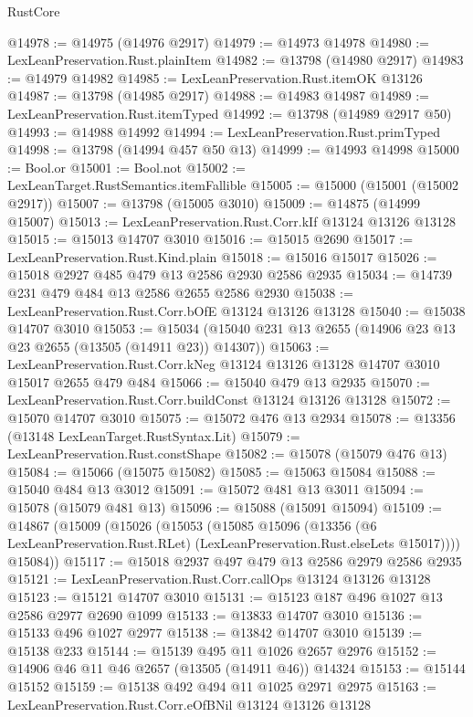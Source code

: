 \begin{lexlean}{RustCore}
\begin{coremodule}
@14978 := @14975 (@14976 @2917)
@14979 := @14973 @14978
@14980 := LexLeanPreservation.Rust.plainItem
@14982 := @13798 (@14980 @2917)
@14983 := @14979 @14982
@14985 := LexLeanPreservation.Rust.itemOK @13126
@14987 := @13798 (@14985 @2917)
@14988 := @14983 @14987
@14989 := LexLeanPreservation.Rust.itemTyped
@14992 := @13798 (@14989 @2917 @50)
@14993 := @14988 @14992
@14994 := LexLeanPreservation.Rust.primTyped
@14998 := @13798 (@14994 @457 @50 @13)
@14999 := @14993 @14998
@15000 := Bool.or
@15001 := Bool.not
@15002 := LexLeanTarget.RustSemantics.itemFallible
@15005 := @15000 (@15001 (@15002 @2917))
@15007 := @13798 (@15005 @3010)
@15009 := @14875 (@14999 @15007)
@15013 := LexLeanPreservation.Rust.Corr.kIf @13124 @13126 @13128
@15015 := @15013 @14707 @3010
@15016 := @15015 @2690
@15017 := LexLeanPreservation.Rust.Kind.plain
@15018 := @15016 @15017
@15026 := @15018 @2927 @485 @479 @13 @2586 @2930 @2586 @2935
@15034 := @14739 @231 @479 @484 @13 @2586 @2655 @2586 @2930
@15038 := LexLeanPreservation.Rust.Corr.bOfE @13124 @13126 @13128
@15040 := @15038 @14707 @3010
@15053 := @15034 (@15040 @231 @13 @2655 (@14906 @23 @13 @23 @2655 (@13505 (@14911 @23)) @14307))
@15063 := LexLeanPreservation.Rust.Corr.kNeg
    @13124
    @13126
    @13128
    @14707
    @3010
    @15017
    @2655
    @479
    @484
@15066 := @15040 @479 @13 @2935
@15070 := LexLeanPreservation.Rust.Corr.buildConst @13124 @13126 @13128
@15072 := @15070 @14707 @3010
@15075 := @15072 @476 @13 @2934
@15078 := @13356 (@13148 LexLeanTarget.RustSyntax.Lit)
@15079 := LexLeanPreservation.Rust.constShape
@15082 := @15078 (@15079 @476 @13)
@15084 := @15066 (@15075 @15082)
@15085 := @15063 @15084
@15088 := @15040 @484 @13 @3012
@15091 := @15072 @481 @13 @3011
@15094 := @15078 (@15079 @481 @13)
@15096 := @15088 (@15091 @15094)
@15109 := @14867
    (@15009
      (@15026
        (@15053
          (@15085
            @15096
            (@13356 (@6 LexLeanPreservation.Rust.RLet) (LexLeanPreservation.Rust.elseLets @15017))))
        @15084))
@15117 := @15018 @2937 @497 @479 @13 @2586 @2979 @2586 @2935
@15121 := LexLeanPreservation.Rust.Corr.callOps @13124 @13126 @13128
@15123 := @15121 @14707 @3010
@15131 := @15123 @187 @496 @1027 @13 @2586 @2977 @2690 @1099
@15133 := @13833 @14707 @3010
@15136 := @15133 @496 @1027 @2977
@15138 := @13842 @14707 @3010
@15139 := @15138 @233
@15144 := @15139 @495 @11 @1026 @2657 @2976
@15152 := @14906 @46 @11 @46 @2657 (@13505 (@14911 @46)) @14324
@15153 := @15144 @15152
@15159 := @15138 @492 @494 @11 @1025 @2971 @2975
@15163 := LexLeanPreservation.Rust.Corr.eOfBNil @13124 @13126 @13128

\end{coremodule}
\end{lexlean}
